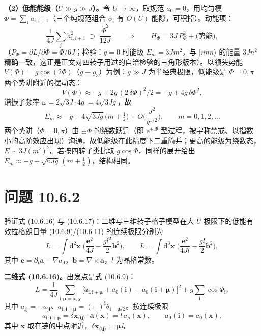 \textbf{（2）低能能级（$U\gg g\gg J$）。}令 $U\to\infty$，取规范 $a_0=0$，用均匀模 $\Phi=\sum_i a_{i,i+1}$（三个纯规范组合 $\phi_i$ 有 $O(U)$ 能隙，可积掉）。动能项：
\begin{equation*}
\frac{1}{4J}\sum_{i}\dot a_{i,i+1}^{2}\;\supset\;\frac{\dot\Phi^{2}}{12J}
\qquad\Longrightarrow\qquad
H_{\Phi}=3J\,P_{\Phi}^{2}+\big(\text{势能}\big),
\end{equation*}
（$P_{\Phi}=\partial L/\partial\dot\Phi=\dot\Phi/6J$；检验：$g=0$ 时能级 $E_m=3Jm^{2}$，与 $|nnn\rangle$ 的能量 $3Jn^{2}$ 精确一致，这正是正文对四转子用过的自洽检验的三角形版本）。以领头势能 $V(\Phi)=g\cos(2\Phi)$（$g\equiv g_3$）为例：$g\gg J$ 为半经典极限，低能级是 $\Phi=0,\pi$ 两个势阱附近的摆动态：
\begin{equation*}
V(\Phi)\approx-g+2g\,(2\,\delta\Phi)^{2}/2=-g+4g\,\delta\Phi^{2},
\end{equation*}
谐振子频率 $\omega=2\sqrt{3J\cdot4g}=4\sqrt{3Jg}$，故
\begin{equation*}
\boxed{\;E_{m}\approx-g+4\sqrt{3Jg}\,\Big(m+\tfrac12\Big)+O\!\Big(\frac{J^{2}}{g^{1/2}}\Big),\qquad m=0,1,2,\dots\;}
\end{equation*}
两个势阱（$\Phi=0,\pi$）由 $\pm\Phi$ 的绕数跃迁（即 $\mathrm e^{\pm\mathrm i\Phi}$ 型过程，被宇称禁戒、以指数小的高阶效应出现）沟通，故低能级在此精度下二重简并；更高的能级为绕数态，$E\sim3J(m')^{2}$。若按四转子类比取 $g\cos\Phi$，同样的展开给出 $E_m\approx-g+\sqrt{6Jg}\,(m+\tfrac12)$，结构相同。

\section*{问题 10.6.2}
\begin{problem}
验证式 (10.6.16) 与 (10.6.17)：二维与三维转子格子模型在大 $U$ 极限下的低能有效拉格朗日量 (10.6.9)/(10.6.11) 的连续极限分别为
\begin{equation*}
L=\int\mathrm d^{2}\pmb x\;\Big(\frac{\pmb e^{2}}{4J}-\frac{gl^{2}}{2}\pmb b^{2}\Big),\qquad
L=\int\mathrm d^{3}\pmb x\;\Big(\frac{\pmb e^{2}}{4Jl}-\frac{gl}{2}\pmb b^{2}\Big),
\end{equation*}
其中 $\pmb e=\partial_t\pmb a-\nabla a_0$，$\pmb b=\nabla\times\pmb a$，$l$ 为晶格常数。
\end{problem}
\solution
\textbf{二维式 (10.6.16)。}出发点是式 (10.6.9)：
\begin{equation*}
L=\frac{1}{4J}\sum_{\pmb i,\pmb\mu=\pmb x,\pmb y}\big[\dot a_{\pmb i,\pmb i+\pmb\mu}+a_0(\pmb i)-a_0(\pmb i+\pmb\mu)\big]^{2}
+g\sum_{\pmb i}\cos\Phi_{\pmb i},
\end{equation*}
其中 $a_{\pmb i\pmb j}=-a_{\pmb j\pmb i}$、$a_{\pmb i,\pmb i+\pmb\mu}=(-)^{\pmb i}\theta_{\pmb i+\pmb\mu/2}$。按连续极限
\begin{equation*}
a_{\pmb i,\pmb i+\pmb\mu}=\delta\pmb x_{\langle\pmb i\pmb j\rangle}\cdot\pmb a(\pmb x)=l\,a_\mu(\pmb x),\qquad
a_0(\pmb i)=a_0(\pmb x),
\end{equation*}
其中 $\pmb x$ 取在链的中点附近，$\delta\pmb x_{\langle\pmb i\pmb j\rangle}=\pmb\mu\,l$。

